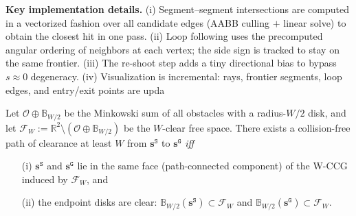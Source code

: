 \noindent\textbf{Key implementation details.}
(i) Segment–segment intersections are computed in a vectorized fashion over all candidate edges (AABB culling $+$ linear solve) to obtain the closest hit in one pass.
(ii) Loop following uses the precomputed angular ordering of neighbors at each vertex; the side sign is tracked to stay on the same frontier.
(iii) The re-shoot step adds a tiny directional bias to bypass $s\!\approx\!0$ degeneracy.
(iv) Visualization is incremental: rays, frontier segments, loop edges, and entry/exit points are upda

\begin{theorem}
\label{thm:complete-W-test}
Let $\mathcal{O}\oplus \mathbb{B}_{W/2}$ be the Minkowski sum of all obstacles with a radius-$W/2$ disk, and let
$\mathcal{F}_W := \mathbb{R}^2 \setminus (\mathcal{O}\oplus \mathbb{B}_{W/2})$
be the $W$-clear free space.
There exists a collision-free path of clearance at least $W$ from
$\mathbf{s}^{\texttt{S}}$ to $\mathbf{s}^{\texttt{G}}$ \emph{iff}
\begin{enumerate}\itemsep2pt
\item[\textup{(i)}] $\mathbf{s}^{\texttt{S}}$ and $\mathbf{s}^{\texttt{G}}$ lie in the same face (path-connected component) of the W-CCG induced by $\mathcal{F}_W$, and
\item[\textup{(ii)}] the endpoint disks are clear:
$\mathbb{B}_{W/2}(\mathbf{s}^{\texttt{S}})\subset \mathcal{F}_W$ and
$\mathbb{B}_{W/2}(\mathbf{s}^{\texttt{G}})\subset \mathcal{F}_W$.
\end{enumerate}
\end{theorem}

